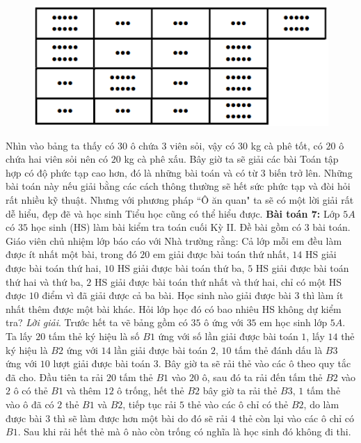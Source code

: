 \begin{multicols}{2}
	\begin{figure}[H]
		\vspace*{5pt}
		\centering
		\captionsetup{labelformat= empty, justification=centering}
		\includegraphics[width= 1\linewidth]{5}
		\vspace*{-15pt}
	\end{figure}
	Nhìn vào bảng ta thấy có $30$ ô chứa $3$ viên sỏi, vậy có $30$ kg cà phê tốt, có $20$ ô chứa hai viên sỏi nên có $20$ kg cà phê xấu.
	\vskip 0.1cm
	Bây giờ ta sẽ giải các bài Toán tập hợp có độ phức tạp cao hơn, đó là những bài toán và có từ $3$ biến trở lên. Những bài toán này nếu giải bằng các cách thông thường sẽ hết sức phức tạp và đòi hỏi rất nhiều kỹ thuật. Nhưng với phương pháp ``Ô ăn quan" ta sẽ có một lời giải rất dễ hiểu, đẹp đẽ và học sinh Tiểu học cũng có thể hiểu được.
	\vskip 0.1cm
	\textbf{\color{diendantoanhoc}Bài toán $\pmb7$:}
	\vskip 0.1cm
	Lớp $5A$ có $35$ học sinh (HS) làm bài kiểm tra toán cuối Kỳ II. Đề bài gồm có $3$ bài toán. Giáo viên chủ nhiệm lớp báo cáo với Nhà trường rằng: Cả lớp mỗi em đều làm được ít nhất một bài, trong đó $20$ em giải được bài toán thứ nhất, $14$ HS giải được bài toán thứ hai, $10$ HS giải được bài toán thứ ba, $5$ HS giải được bài toán thứ hai và thứ ba, $2$ HS giải được bài toán thứ nhất và thứ hai, chỉ có một HS được $10$ điểm vì đã giải được cả ba bài. Học sinh nào giải được bài $3$ thì làm ít nhất thêm được một bài khác.
	Hỏi lớp học đó có bao nhiêu HS không dự kiểm tra?
	\vskip 0.1cm
	\textit{Lời giải}.
	Trước hết ta vẽ bảng gồm có $35$ ô ứng với $35$ em học sinh lớp $5A$. Ta lấy $20$ tấm thẻ ký hiệu là số $B1$ ứng với số lần giải được bài toán $1$, lấy $14$ thẻ ký hiệu là $B2$ ứng với $14$ lần giải được bài toán $2$, $10$ tấm thẻ đánh dấu là $B3$ ứng với $10$ lượt giải được bài toán $3$. Bây giờ ta sẽ rải thẻ vào các ô theo quy tắc đã cho. Đầu tiên ta rải $20$ tấm thẻ $B1$ vào $20$ ô, sau đó ta rải đến tấm thẻ $B2$ vào $2$ ô có thẻ $B1$ và thêm $12$ ô trống, hết thẻ $B2$ bây giờ ta rải thẻ $B3$, $1$ tấm thẻ vào ô đã có $2$ thẻ $B1$ và $B2$, tiếp tục rải $5$ thẻ vào các ô chỉ có thẻ $B2$, do làm được bài $3$ thì sẽ làm được hơn một bài do đó sẽ rải $4$ thẻ còn lại vào các ô chỉ có $B1$. Sau khi rải hết thẻ mà ô nào còn trống có nghĩa là học sinh đó không đi thi.

\end{multicols}
